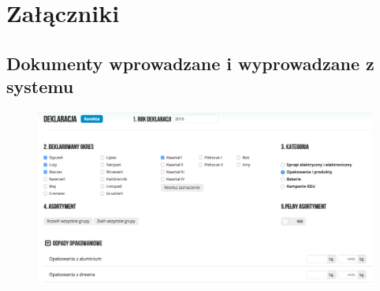 \documentclass[paper=a4, fontsize=12pt]{scrartcl}
\numberwithin{equation}{section}		%
\numberwithin{figure}{section}			%
\numberwithin{table}{section}				%
\begin{document}
\section{Załączniki}
	\subsection{Dokumenty wprowadzane i wyprowadzane z systemu}
		\begin{landscape}
			
		\end{landscape}
		\begin{landscape}
			\begin{figure}[H]
				\centering
				\centerline{\includegraphics[width=28cm]{partials/2-wymagania/dokumenty/formularz.png}}
			\end{figure}
		\end{landscape}
		
\end{document}
